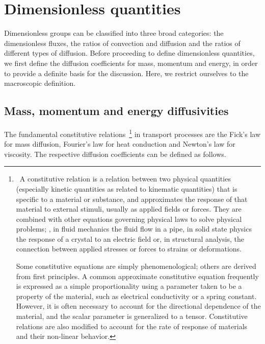 \section{Dimensionless quantities}
Dimensionless groups can be classified into three broad categories: the dimensionless fluxes, the ratios of convection and diffusion and the ratios of different types of diffusion. Before proceeding to define dimensionless quantities, we first define the diffusion coefficients for mass, momentum and energy, in order to provide a definite basis for the discussion. Here, we restrict ourselves to the macroscopic definition.


\subsection{Mass, momentum and energy diffusivities}
The fundamental constitutive relations~\footnote{~A constitutive relation is a relation between two physical quantities (especially kinetic quantities as related to kinematic quantities) that is specific to a material or substance, and approximates the response of that material to external stimuli, usually as applied fields or forces. They are combined with other equations governing physical laws to solve physical problems; \eg, in fluid mechanics the fluid flow in a pipe, in solid state physics the response of a crystal to an electric field or, in structural analysis, the connection between applied stresses or forces to strains or deformations. 

Some constitutive equations are simply phenomenological; others are derived from first principles. A common approximate constitutive equation frequently is expressed as a simple proportionality using a parameter taken to be a property of the material, such as electrical conductivity or a spring constant. However, it is often necessary to account for the directional dependence of the material, and the scalar parameter is generalized to a tensor. Constitutive relations are also modified to account for the rate of response of materials and their non-linear behavior.} in transport processes are the Fick's law for mass diffusion, Fourier's law for heat conduction and Newton's law for viscosity. The respective diffusion coefficients can be defined as follows.
%
